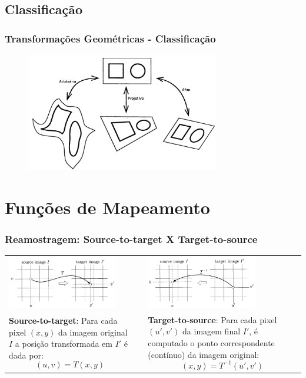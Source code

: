 \documentclass{beamer}
\begin{document}
\subsection{Classificação}
\begin{frame}
 \frametitle{Transformações Geométricas - Classificação}
\begin{figure}[ht!]
  \centering
  \includegraphics[width=0.75\textwidth]{img/affine-projective-arbitrary.png}
\end{figure}
\end{frame}

\section{Funções de Mapeamento}
\begin{frame}
\frametitle{Reamostragem: Source-to-target X Target-to-source}
\begin{tabular*}{0.75\textwidth}{ p{4cm} p{.6cm} p{4cm}}
\includegraphics[width=1.9in]{img/source-to-target-mapping.png}  & &
\includegraphics[width=1.9in]{img/target-to-source-mapping.png} \\
\scriptsize
\textbf{Source-to-target}: Para cada pixel $(x,y)$ da imagem original
$I$ a posição transformada em $I'$ é dada por: 
\begin{equation*}
 (u,v)=T(x,y)
\end{equation*} & &
\scriptsize
\textbf{Target-to-source}: Para cada pixel $(u',v')$ da imagem final
$I'$, é computado o ponto correspondente (contínuo) da imagem original: 
\begin{equation*}
 (x, y)=T^{-1}(u',v')
\end{equation*} \\
\end{tabular*}
\end{frame}
\end{document}
